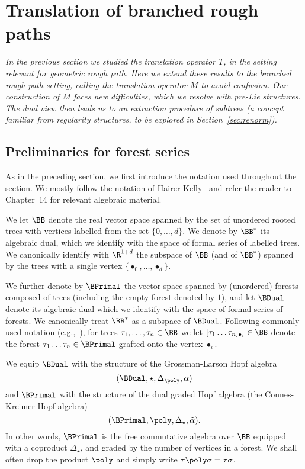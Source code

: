 \documentclass{article}
\begin{document}
\newpage

\section{Translation of branched rough paths}   \label{sec:TbRP}
\label{sec:Branched}

{\it In the previous section we studied the translation operator $T$, in the setting relevant for geometric rough path. Here we extend these results to the branched rough path setting, calling the translation operator $M$ to avoid confusion. Our construction of $M$ faces new difficulties, which we resolve with pre-Lie structures. The dual view then leads us to an extraction procedure of subtrees (a concept familiar from regularity structures, to be explored in Section~\ref{sec:renorm}).
}

\subsection{Preliminaries for forest series}\label{subsec:PrelimsForest}

As in the preceding section, we first introduce the notation used throughout the section. We mostly follow the notation of Hairer-Kelly~\cite{HairerKelly15} and refer the reader to~\cite{GraciaBondia01} Chapter~14 for relevant algebraic material.

We let $\BB$ denote the real vector space spanned by the set of unordered rooted trees with vertices labelled from the set $\{0,\ldots, d\}$. We denote by $\BB^*$ its algebraic dual, which we identify with the space of formal series of labelled trees. We canonically identify with $\R^{1+d}$ the subspace of $\BB$ (and of $\BB^*$) spanned by the trees with a single vertex $\{\bullet_0,\ldots, \bullet_d\}$.

We further denote by $\BPrimal$ the vector space spanned by (unordered) forests composed of trees (including the empty forest denoted by $1$), and let $\BDual$ denote its algebraic dual which we identify with the space of formal series of forests. We canonically treat $\BB^*$ as a subspace of $\BDual$. Following commonly used notation (e.g.,~\cite{HairerKelly15}),
for trees $\tau_1,\ldots,\tau_n \in \BB$ we let $[\tau_1\ldots\tau_n]_{\bullet_i} \in \BB$ denote the forest $\tau_1\ldots\tau_n \in \BPrimal$ grafted onto the vertex $\bullet_i$.

We equip $\BDual$ with the structure of the Grossman-Larson Hopf algebra
\[
(\BDual, \star, \Delta_\poly, \alpha)
\]
and $\BPrimal$ with the structure of the dual graded Hopf algebra (the Connes-Kreimer Hopf algebra)
\[
(\BPrimal, \poly, \Delta_\star, \tilde\alpha).
\]
In other words, $\BPrimal$ is the free commutative algebra over $\BB$ equipped with a coproduct $\Delta_\star$, and graded by the number of vertices in a forest. We shall often drop the product $\poly$ and simply write $\tau\poly \sigma = \tau \sigma$.
\end{document}
